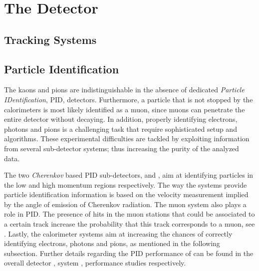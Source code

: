 
\chapter{The \lhcb Detector}
\label{lhcb_detector}


\section{Tracking Systems}
\label{det_tracking}


\section{Particle Identification}
\label{det_pid}

The kaons and pions are indistinguishable in the absence of dedicated {\it Particle IDentification}, PID, detectors.
Furthermore, a particle that is not stopped by the calorimeters is most likely identified as a muon,
since muons can penetrate the entire \lhcb detector without decaying. In addition, properly identifying
electrons, photons and pions is a challenging task that require sophisticated setup and algorithms.
These experimental difficulties are tackled by exploiting information from several sub-detector systems;
thus increasing the purity of the analyzed data.

The two {\it Cherenkov} based PID sub-detectors, \richone and \richtwo, aim at identifying particles in
the low and high momentum regions respectively. The way the \rich systems provide particle identification information is
based on the velocity measurement implied by the angle of emission of Cherenkov radiation.
The muon system also plays a role in PID. The presence of hits in the muon stations that
could be associated to a certain track increase the probability that this track corresponds to a muon,
see . Lastly, the calorimeter systems aim at increasing the chances of correctly
identifying electrons, photons and pions, as mentioned in the following subsection.
Further details regarding the PID performance of \lhcb can be found in the overall detector \cite{Aaij:2014jba},
\rich system \cite{Adinolfi:1495721}, \muonID \cite{Archilli:1553139} performance studies respectively.

